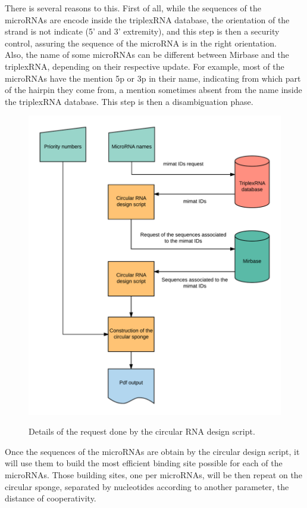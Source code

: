 \documentclass[a4paper,12pt]{report}
\begin{document}
There is several reasons to this. First of all, while the sequences of the microRNAs are encode inside the triplexRNA database, the orientation of the strand is not indicate (5' and 3' extremity), and this step is then a security control, assuring the sequence of the microRNA is in the right orientation.\\

 Also, the name of some microRNAs can be different between Mirbase and the triplexRNA, depending on their respective update. For example, most of the microRNAs have the mention 5p or 3p in their name, indicating from which part of the hairpin they come from, a mention sometimes absent from the name inside the triplexRNA database. This step is then a disambiguation phase. 



\begin{figure}[H]
	\centering
	{\includegraphics[width=1\textwidth]{Blank.png}}
	\caption{Details of the request done by the circular RNA design script.}
\end{figure}

Once the sequences of the microRNAs are obtain by the circular design script, it will use them to build the most efficient binding site possible for each of the microRNAs. Those building sites, one per microRNAs, will be then repeat on the circular sponge, separated by nucleotides according to another parameter, the distance of cooperativity\cite{coop}. \\
\end{document}
